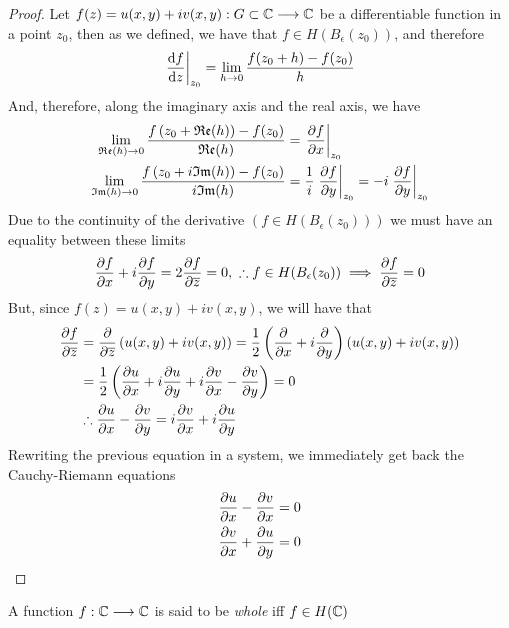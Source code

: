 \documentclass[../complete.tex]{subfiles}
\begin{document}
\begin{proof}
	Let $f(z)=u(x,y)+iv(x,y):G\subset\Cf\fto\Cf$ be a differentiable function in a point $z_0$, then as we defined, we have that $f\in H(B_\epsilon(z_0))$, and therefore
	\begin{equation*}
		\derin[z_0]{\derivative{f}{z}}=\lim_{h\to0}\frac{f(z_0+h)-f(z_0)}{h}
	\end{equation*}
	And, therefore, along the imaginary axis and the real axis, we have
	\begin{equation*}
		\begin{aligned}
			\lim_{\real(h)\to0}\frac{f\left( z_0+\real(h) \right)-f(z_0)}{\real(h)}&=\derin[z_0]{\pdv{f}{x}}\\
			\lim_{\imaginary(h)\to0}\frac{f\left( z_0+i\imaginary(h) \right)-f(z_0)}{i\imaginary(h)}&=\frac{1}{i}\derin[z_0]{\pdv{f}{y}}=-i\derin[z_0]{\pdv{f}{y}}
		\end{aligned}
	\end{equation*}
	Due to the continuity of the derivative $\left( f\in H(B_\epsilon(z_0)) \right)$ we must have an equality between these limits
	\begin{equation*}
		\pdv{f}{x}+i\pdv{f}{y}=2\pdv{f}{\cc{z}}=0,\ \therefore f\in H(B_\epsilon(z_0))\implies{}\pdv{f}{\cc{z}}=0
	\end{equation*}
	But, since $f(z)=u(x,y)+iv(x,y)$, we will have that
	\begin{equation*}
		\begin{aligned}
			\pdv{f}{\cc{z}}&=\pdv{\cc{z}}\left( u(x,y)+iv(x,y) \right)=\frac{1}{2}\left( \pdv{x}+i\pdv{y} \right)\left( u(x,y)+iv(x,y) \right)\\
			&=\frac{1}{2}\left( \pdv{u}{x}+i\pdv{u}{y}+i\pdv{v}{x}-\pdv{v}{y} \right)=0\\
			&\therefore\pdv{u}{x}-\pdv{v}{y}=i\pdv{v}{x}+i\pdv{u}{y}
		\end{aligned}
	\end{equation*}
	Rewriting the previous equation in a system, we immediately get back the Cauchy-Riemann equations
	\begin{equation*}
		\begin{aligned}
			\pdv{u}{x}-\pdv{v}{x}&=0\\
			\pdv{v}{x}+\pdv{u}{y}&=0
		\end{aligned}
	\end{equation*}
\end{proof}
\begin{dfn}
	A function $f:\Cf\fto\Cf$ is said to be \textit{whole} iff $f\in H(\Cf)$
\end{dfn}
\end{document}
